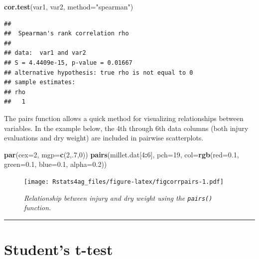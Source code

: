 \documentclass[letterpaper,]{book}
\newenvironment{Shaded}{\begin{snugshade}}{\end{snugshade}}
\newcommand{\DataTypeTok}[1]{\textcolor[rgb]{0.13,0.29,0.53}{#1}}
\newcommand{\DecValTok}[1]{\textcolor[rgb]{0.00,0.00,0.81}{#1}}
\newcommand{\FloatTok}[1]{\textcolor[rgb]{0.00,0.00,0.81}{#1}}
\newcommand{\KeywordTok}[1]{\textcolor[rgb]{0.13,0.29,0.53}{\textbf{#1}}}
\newcommand{\NormalTok}[1]{#1}
\newcommand{\OperatorTok}[1]{\textcolor[rgb]{0.81,0.36,0.00}{\textbf{#1}}}
\newcommand{\StringTok}[1]{\textcolor[rgb]{0.31,0.60,0.02}{#1}}
\begin{document}
\begin{Shaded}
\begin{Highlighting}[]
\KeywordTok{cor.test}\NormalTok{(var1, var2, }\DataTypeTok{method=}\StringTok{"spearman"}\NormalTok{)}
\end{Highlighting}
\end{Shaded}

\begin{verbatim}
## 
##  Spearman's rank correlation rho
## 
## data:  var1 and var2
## S = 4.4409e-15, p-value = 0.01667
## alternative hypothesis: true rho is not equal to 0
## sample estimates:
## rho 
##   1
\end{verbatim}

The pairs function allows a quick method for visualizing relationships between variables. In the example below, the 4th through 6th data columns (both injury evaluations and dry weight) are included in pairwise scatterplots.



\begin{Shaded}
\begin{Highlighting}[]
\KeywordTok{par}\NormalTok{(}\DataTypeTok{cex=}\DecValTok{2}\NormalTok{, }\DataTypeTok{mgp=}\KeywordTok{c}\NormalTok{(}\DecValTok{2}\NormalTok{,.}\DecValTok{7}\NormalTok{,}\DecValTok{0}\NormalTok{))}
\KeywordTok{pairs}\NormalTok{(millet.dat[}\DecValTok{4}\OperatorTok{:}\DecValTok{6}\NormalTok{], }\DataTypeTok{pch=}\DecValTok{19}\NormalTok{, }\DataTypeTok{col=}\KeywordTok{rgb}\NormalTok{(}\DataTypeTok{red=}\FloatTok{0.1}\NormalTok{, }\DataTypeTok{green=}\FloatTok{0.1}\NormalTok{, }\DataTypeTok{blue=}\FloatTok{0.1}\NormalTok{, }\DataTypeTok{alpha=}\FloatTok{0.2}\NormalTok{))}
\end{Highlighting}
\end{Shaded}

\begin{figure}
\centering
\texttt{[image: Rstats4ag\_files/figure-latex/figcorrpairs-1.pdf]}
\caption{\label{fig:figcorrpairs}\emph{Relationship between injury and dry weight using the \texttt{pairs()} function.}}
\end{figure}

\begin{center}\rule{0.5\linewidth}{0.5pt}\end{center}

\hypertarget{students-t-test}{%
\chapter{Student's t-test}\label{students-t-test}}
\end{document}
